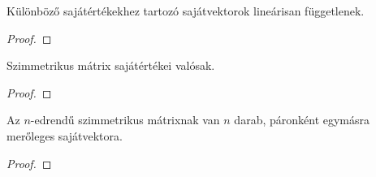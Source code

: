 \begin{statement}
  Különböző sajátértékekhez tartozó sajátvektorok lineárisan függetlenek.

  \begin{proof}
    \vspace{10em}
  \end{proof}
\end{statement}

\begin{statement}
  Szimmetrikus mátrix sajátértékei valósak.

  \begin{proof}
    \vspace{10em}
  \end{proof}
\end{statement}

\begin{statement}
  Az $n$-edrendű szimmetrikus mátrixnak van $n$ darab, páronként egymásra
  merőleges sajátvektora.

  \begin{proof}
    \vspace{10em}
  \end{proof}
\end{statement}

